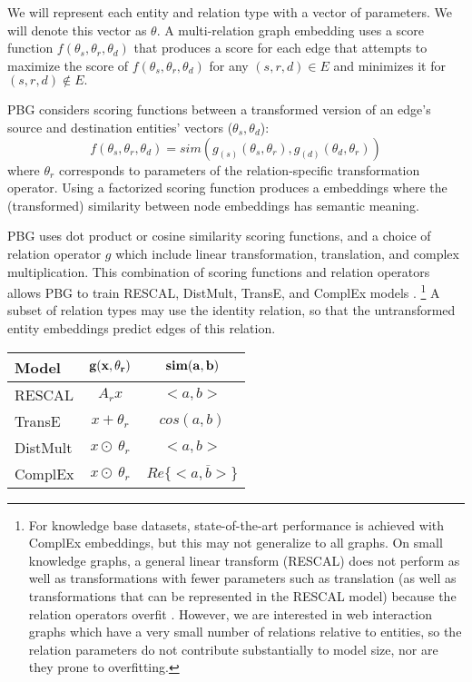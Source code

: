 \documentclass{article}
\begin{document}
We will represent each entity and relation type with a vector of parameters. We will denote this vector as $\theta$. A multi-relation graph embedding uses a score function $f(\theta_s, \theta_r, \theta_d)$ that produces a score for each edge that attempts to maximize the score of $f(\theta_s, \theta_r, \theta_d)$ for any $(s, r, d) \in E$ and minimizes it for $(s, r, d) \not \in E.$

PBG considers scoring functions between a transformed version of an edge's source and destination entities' vectors ($\theta_s, \theta_d$): $$f(\theta_s, \theta_r, \theta_d)=sim\left(g_{(s)}(\theta_s, \theta_r), g_{(d)}(\theta_d, \theta_r)\right)$$ where $\theta_r$ corresponds to parameters of the relation-specific transformation operator. Using a factorized scoring function produces a embeddings where the (transformed) similarity between node embeddings has semantic meaning.

PBG uses dot product or cosine similarity scoring functions, and a choice of relation operator $g$ which include linear transformation, translation, and complex multiplication. This combination of scoring functions and relation operators allows PBG to train RESCAL, DistMult, TransE, and ComplEx models \cite{nickel2011three,yang2014embedding,transE,trouillon2016complex}. \footnote{For knowledge base datasets, state-of-the-art performance is achieved with ComplEx embeddings, but this may not generalize to all graphs. On small knowledge graphs, a general linear transform (RESCAL) does not perform as well as transformations with fewer parameters such as translation (as well as transformations that can be represented in the RESCAL model) because the relation operators overfit \cite{hole}. However, we are interested in web interaction graphs which have a very small number of relations relative to entities, so the relation parameters do not contribute substantially to model size, nor are they prone to overfitting.} A subset of relation types may use the identity relation, so that the untransformed entity embeddings predict edges of this relation.

\begin{table}[ht]
\centering
\begin{tabular}{| l | c c | }
\hline
\textbf{Model} & ${\bf g(x,\theta_r)}$ & ${\bf sim(a, b)}$\\
\hline
RESCAL & $A_r x$ & $<a, b>$\\
TransE & $x + \theta_r$ & $cos(a, b)$\\
DistMult & $x \odot\ \theta_r$ & $<a, b>$ \\
ComplEx & $x \odot\ \theta_r$ & $Re\{<a, \overline{b}>\}$ \\
\hline 
\end{tabular}
\end{table}
\end{document}

